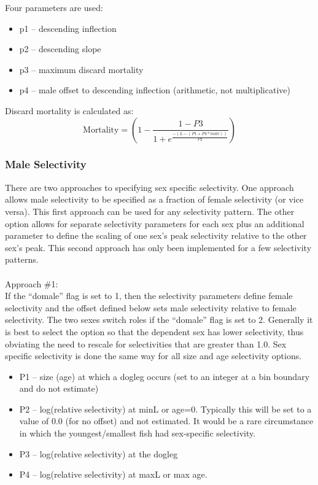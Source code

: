 Four parameters are used:
\begin{itemize}
	\item p1 – descending inflection
	\item p2 – descending slope
	\item p3 – maximum discard mortality
	\item p4 – male offset to descending inflection (arithmetic, not multiplicative)
\end{itemize}

Discard mortality is calculated as:
\begin{equation}
	\text{Mortality} = \left(1 - \frac{1-P3}{1+e^{\frac{-(L-(P1+P4*male))}{P2}}}\right)
\end{equation}

\subsubsection{Male Selectivity}
There are two approaches to specifying sex specific selectivity.  One approach allows male selectivity to be specified as a fraction of female selectivity (or vice versa).  This first approach can be used for any selectivity pattern.  The other option allows for separate selectivity parameters for each sex plus an additional parameter to define the scaling of one sex’s peak selectivity relative to the other sex’s peak.  This second approach has only been implemented for a few selectivity patterns.\\
\\
Approach \#1:\\
If the “domale” flag is set to 1, then the selectivity parameters define female selectivity and the offset defined below sets male selectivity relative to female selectivity.  The two sexes switch roles if the “domale” flag is set to 2.  Generally it is best to select the option so that the dependent sex has lower selectivity, thus obviating the need to rescale for selectivities that are greater than 1.0.  Sex specific selectivity is done the same way for all size and age selectivity options.
\begin{itemize}
	\item P1 – size (age) at which a dogleg occurs (set to an integer at a bin boundary and do not estimate)
	\item P2 – log(relative selectivity) at minL or age=0.  Typically this will be set to a value of 0.0 (for no offset) and not estimated.  It would be a rare circumstance in which the youngest/smallest fish had sex-specific selectivity.
	\item P3 – log(relative selectivity) at the dogleg
	\item P4 – log(relative selectivity) at maxL or max age.
\end{itemize}

